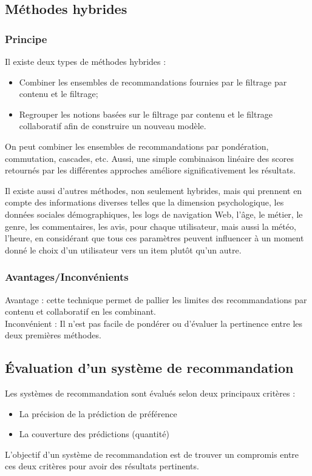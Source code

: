\documentclass{article}
\begin{document}
\subsection{Méthodes hybrides}

\subsubsection{Principe}

Il existe deux types de méthodes hybrides :
\begin{itemize}
    \item Combiner les ensembles de recommandations fournies par le filtrage par contenu et le filtrage;
    \item Regrouper les notions basées sur le filtrage par contenu et le filtrage collaboratif afin de construire un nouveau modèle.
\end{itemize}
On peut combiner les ensembles de recommandations par pondération, commutation, cascades, etc.
Aussi, une simple combinaison linéaire des scores retournés par les différentes approches améliore significativement les résultats.

Il existe aussi d'autres méthodes, non seulement hybrides, mais qui prennent en compte des informations diverses telles que la dimension psychologique, les données sociales démographiques, les logs de navigation Web, l'âge, le métier, le genre, les commentaires, les avis, pour chaque utilisateur, mais aussi la météo, l'heure, en considérant que tous ces paramètres peuvent influencer à un moment donné le choix d'un utilisateur vers un item plutôt qu'un autre.

\subsubsection{Avantages/Inconvénients}

    Avantage : cette technique permet de pallier les limites des recommandations par contenu et collaboratif en les combinant.
    \newline
    \\ Inconvénient : Il n'est pas facile de pondérer ou d'évaluer la pertinence entre les deux premières méthodes.

\subsection{Évaluation d'un système de recommandation}

    Les systèmes de recommandation sont évalués selon deux principaux critères :
\begin{itemize}
\item La précision de la prédiction de préférence
\item La couverture des prédictions (quantité)
\end{itemize}
    L'objectif d'un système de recommandation est de trouver un compromis entre ces deux critères pour avoir des résultats pertinents.
\end{document}
